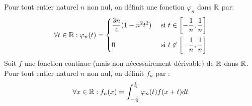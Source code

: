 Pour tout entier naturel $n$ non nul, on définit une fonction $\varphi_n$ dans $\mathbb{R}$ par:
\begin{displaymath}
 \forall t\in \mathbb{R} : \varphi_n(t)=\left\lbrace 
\begin{aligned}
 &\frac{3n}{4}(1-n^2t^2) &\text{ si } t\in \left[ -\frac{1}{n}, \frac{1}{n}\right]\\ 
 &0 &\text{ si } t \not \in \left[ -\frac{1}{n}, \frac{1}{n}\right]
\end{aligned}
\right. 
\end{displaymath}
Soit $f$ une fonction continue (mais non nécessairement dérivable) de $\mathbb{R}$ dans $\mathbb{R}$. Pour tout entier naturel $n$ non nul, on définit $f_n$ par :
\begin{displaymath}
 \forall x\in \mathbb{R} : f_n(x) = \int_{-\frac{1}{n}}^{\frac{1}{n}}\varphi_n(t)f(x+t)dt
\end{displaymath}
 
